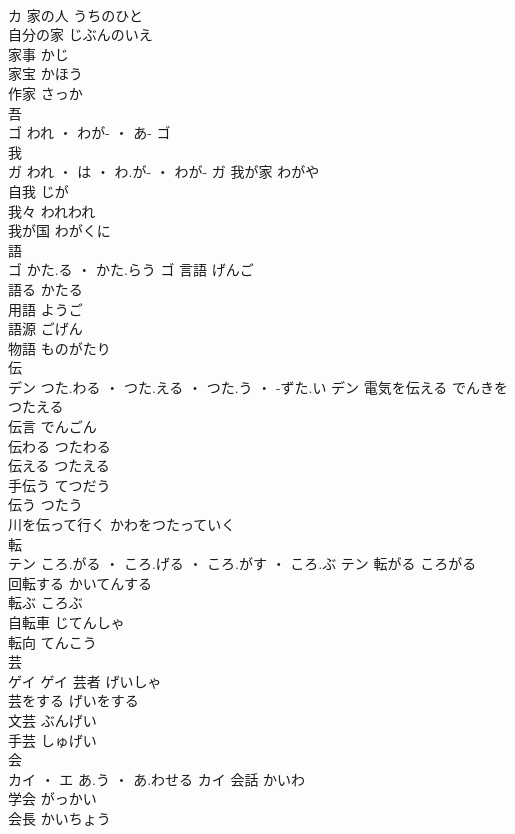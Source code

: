 \documentclass[8pt]{extreport}
\begin{document}
\begin{CJK}{UTF8}{min}
\\	カ	家の人	うちのひと	
\\	自分の家	じぶんのいえ	
\\	家事	かじ	
\\	家宝	かほう	
\\	作家	さっか	
\\	吾	
\\	ゴ	われ ・ わが- ・ あ-	ゴ																																			
\\	我	
\\	ガ	われ ・ は ・ わ.が- ・ わが-	ガ	我が家	わがや	
\\	自我	じが	
\\	我々	われわれ	
\\	我が国	わがくに	
\\	語	
\\	ゴ	かた.る ・ かた.らう	ゴ	言語	げんご	
\\	語る	かたる	
\\	用語	ようご	
\\	語源	ごげん	
\\	物語	ものがたり	
\\	伝	
\\	デン	つた.わる ・ つた.える ・ つた.う ・ -ずた.い	デン	電気を伝える	でんきをつたえる	
\\	伝言	でんごん	
\\	伝わる	つたわる	
\\	伝える	つたえる	
\\	手伝う	てつだう	
\\	伝う	つたう	
\\	川を伝って行く	かわをつたっていく	
\\	転	
\\	テン	ころ.がる ・ ころ.げる ・ ころ.がす ・ ころ.ぶ	テン	転がる	ころがる	
\\	回転する	かいてんする	
\\	転ぶ	ころぶ	
\\	自転車	じてんしゃ	
\\	転向	てんこう	
\\	芸	
\\	ゲイ		ゲイ	芸者	げいしゃ	
\\	芸をする	げいをする	
\\	文芸	ぶんげい	
\\	手芸	しゅげい	
\\	会	
\\	カイ ・ エ	あ.う ・ あ.わせる	カイ	会話	かいわ	
\\	学会	がっかい	
\\	会長	かいちょう	

\end{CJK}
\end{document}

